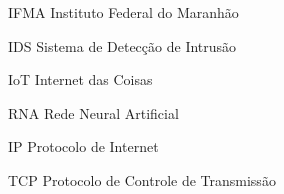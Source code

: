 \begin{siglas}
  \item[IFMA] Instituto Federal do Maranhão
  \item[IDS] Sistema de Detecção de Intrusão
  \item[IoT] Internet das Coisas
  \item [RNA] Rede Neural Artificial
  \item [IP] Protocolo de Internet
  \item [TCP] Protocolo de Controle de Transmissão
\end{siglas}